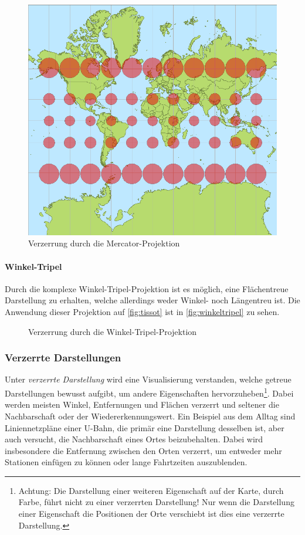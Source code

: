 					\begin{figure}
						\centering
						\includegraphics[width=0.6\linewidth]{mercator}
						\caption{Verzerrung durch die Mercator-Projektion}
						\label{fig:mercator}
					\end{figure}

				\paragraph{Winkel-Tripel}
					Durch die komplexe Winkel-Tripel-Projektion ist es möglich, eine Flächentreue Darstellung zu erhalten, welche allerdings weder Winkel- noch Längentreu ist. Die Anwendung dieser Projektion auf \autoref{fig:tissot} ist in \autoref{fig:winkeltripel} zu sehen.

					\begin{figure}
						\centering
						\def\svgwidth{\linewidth}
						
						\caption{Verzerrung durch die Winkel-Tripel-Projektion}
						\label{fig:winkeltripel}
					\end{figure}

			\subsubsection{Verzerrte Darstellungen}
				Unter \emph{verzerrte Darstellung} wird eine Visualisierung verstanden, welche getreue Darstellungen bewusst aufgibt, um andere Eigenschaften hervorzuheben\footnote{Achtung: Die Darstellung einer weiteren Eigenschaft auf der Karte, \zB durch Farbe, führt nicht zu einer verzerrten Darstellung! Nur wenn die Darstellung einer Eigenschaft die Positionen der Orte verschiebt ist dies eine verzerrte Darstellung.}. Dabei werden meisten Winkel, Entfernungen und Flächen verzerrt und seltener die Nachbarschaft oder der Wiedererkennungswert. Ein Beispiel aus dem Alltag sind Liniennetzpläne einer U-Bahn, die primär eine Darstellung desselben ist, aber auch versucht, die Nachbarschaft eines Ortes beizubehalten. Dabei wird insbesondere die Entfernung zwischen den Orten verzerrt, um entweder mehr Stationen einfügen zu können oder lange Fahrtzeiten auszublenden.

